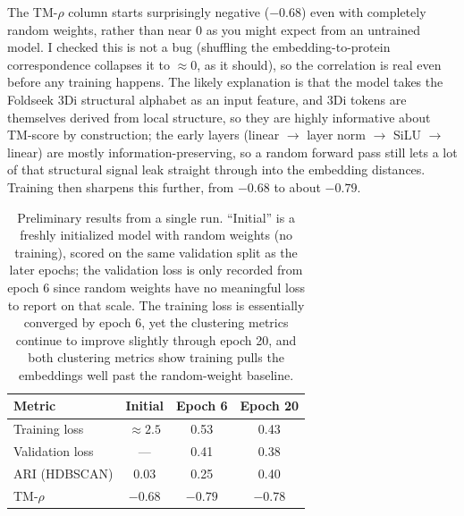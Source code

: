 \documentclass[11pt,a4paper]{article}
\theoremstyle{definition}
\begin{document}
The TM-$\rho$ column starts surprisingly negative ($-0.68$) even with completely
random weights, rather than near 0 as you might expect from an untrained model.
I checked this is not a bug (shuffling the embedding-to-protein correspondence
collapses it to $\approx 0$, as it should), so the correlation is real even
before any training happens. The likely explanation is that the model takes
the Foldseek 3Di structural alphabet as an input feature, and 3Di tokens are
themselves derived from local structure, so they are highly informative about
TM-score by construction; the early layers (linear $\to$ layer norm $\to$
SiLU $\to$ linear) are mostly information-preserving, so a random forward pass
still lets a lot of that structural signal leak straight through into the
embedding distances. Training then sharpens this further, from $-0.68$ to about
$-0.79$.

\begin{table}[h]
\centering
\begin{tabular}{@{}l c c c@{}}
\toprule
Metric & Initial & Epoch 6 & Epoch 20\\
\midrule
Training loss   & $\approx 2.5$ & 0.53    & 0.43\\
Validation loss & ---           & 0.41    & 0.38\\
ARI (HDBSCAN)   & 0.03          & 0.25    & 0.40\\
TM-$\rho$       & $-0.68$       & $-0.79$ & $-0.78$\\
\bottomrule
\end{tabular}
\caption{Preliminary results from a single run. ``Initial'' is a freshly
initialized model with random weights (no training), scored on the same
validation split as the later epochs; the validation loss is only recorded
from epoch 6 since random weights have no meaningful loss to report on that
scale. The training loss is essentially converged by epoch 6, yet the
clustering metrics continue to improve slightly through epoch 20, and both
clustering metrics show training pulls the embeddings well past the
random-weight baseline.}
\label{tab:results}
\end{table}
\end{document}
